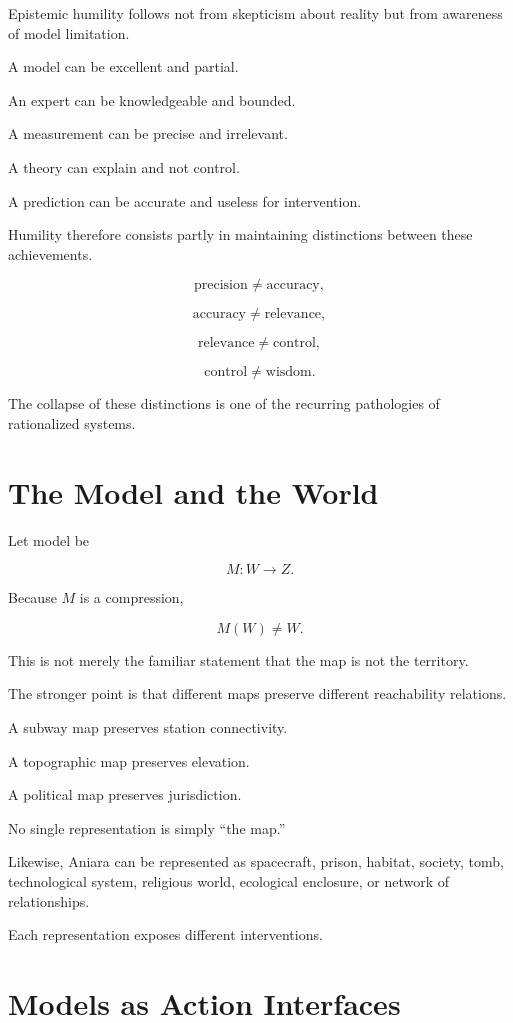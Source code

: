 \documentclass[11pt,oneside]{book}
\theoremstyle{definition}
\theoremstyle{remark}
\begin{document}
Epistemic humility follows not from skepticism about reality but from awareness of model limitation.

A model can be excellent and partial.

An expert can be knowledgeable and bounded.

A measurement can be precise and irrelevant.

A theory can explain and not control.

A prediction can be accurate and useless for intervention.

Humility therefore consists partly in maintaining distinctions between these achievements.

\[
\text{precision}
\neq
\text{accuracy},
\]

\[
\text{accuracy}
\neq
\text{relevance},
\]

\[
\text{relevance}
\neq
\text{control},
\]

\[
\text{control}
\neq
\text{wisdom}.
\]

The collapse of these distinctions is one of the recurring pathologies of rationalized systems.

\section{The Model and the World}

Let model be

\[
M:W\rightarrow Z.
\]

Because \(M\) is a compression,

\[
M(W)\neq W.
\]

This is not merely the familiar statement that the map is not the territory.

The stronger point is that different maps preserve different reachability relations.

A subway map preserves station connectivity.

A topographic map preserves elevation.

A political map preserves jurisdiction.

No single representation is simply ``the map.''

Likewise, Aniara can be represented as spacecraft, prison, habitat, society, tomb, technological system, religious world, ecological enclosure, or network of relationships.

Each representation exposes different interventions.

\section{Models as Action Interfaces}
\end{document}

